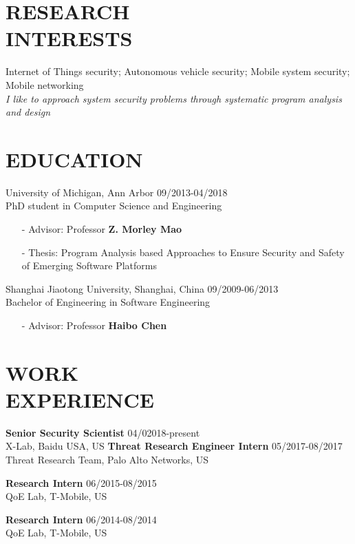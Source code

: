 \documentclass[margin]{res}
\begin{document}
\begin{resume}


\section{RESEARCH \\ INTERESTS}
Internet of Things security; Autonomous vehicle security; Mobile system security; Mobile networking \\
\textit{I like to approach system security problems through systematic program analysis and design}




\section{EDUCATION} 
University of Michigan, Ann Arbor \hfill 09/2013-04/2018 \\
PhD student in Computer Science and Engineering
\begin{itemize}
\item[-] Advisor: Professor \textbf{Z. Morley Mao}
\item[-] Thesis: Program Analysis based Approaches to Ensure Security and Safety of Emerging Software Platforms
\end{itemize}

Shanghai Jiaotong University, Shanghai, China \hfill 09/2009-06/2013 \\
Bachelor of Engineering in Software Engineering
\begin{itemize}
\item[-] Advisor: Professor \textbf{Haibo Chen}
\end{itemize}

\section{WORK\\ EXPERIENCE}
\textbf{Senior Security Scientist} \hfill 04/02018-present\\
X-Lab, Baidu USA, US
\textbf{Threat Research Engineer Intern} \hfill 05/2017-08/2017 \\
Threat Research Team, Palo Alto Networks, US

\textbf{Research Intern} \hfill 06/2015-08/2015 \\
QoE Lab, T-Mobile, US

\textbf{Research Intern} \hfill 06/2014-08/2014 \\
QoE Lab, T-Mobile, US


\end{resume}
\end{document}
